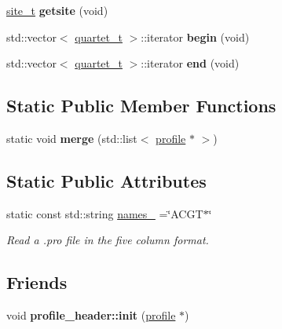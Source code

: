 \begin{DoxyCompactItemize}
\item 
\hypertarget{classprofile_aa7e56e10f37b55e5a2567117869300ef}{\hyperlink{classsite__t}{site\-\_\-t} {\bfseries getsite} (void)}\label{classprofile_aa7e56e10f37b55e5a2567117869300ef}

\item 
\hypertarget{classprofile_a075e3dfdf9550243f974bdf296b84c81}{std\-::vector$<$ \hyperlink{structquartet}{quartet\-\_\-t} $>$\-::iterator {\bfseries begin} (void)}\label{classprofile_a075e3dfdf9550243f974bdf296b84c81}

\item 
\hypertarget{classprofile_a5a833f4d840a4afc764602ee11a5f905}{std\-::vector$<$ \hyperlink{structquartet}{quartet\-\_\-t} $>$\-::iterator {\bfseries end} (void)}\label{classprofile_a5a833f4d840a4afc764602ee11a5f905}

\end{DoxyCompactItemize}
\subsection*{Static Public Member Functions}
\begin{DoxyCompactItemize}
\item 
\hypertarget{classprofile_afcb4eaf9094258e1399ded1386caa73e}{static void {\bfseries merge} (std\-::list$<$ \hyperlink{classprofile}{profile} $\ast$ $>$)}\label{classprofile_afcb4eaf9094258e1399ded1386caa73e}

\end{DoxyCompactItemize}
\subsection*{Static Public Attributes}
\begin{DoxyCompactItemize}
\item 
static const std\-::string \hyperlink{classprofile_a3d781f0fa1b05161fdcc623667fa66ea}{names\-\_\-} =\char`\"{}A\-C\-G\-T$\ast$\char`\"{}
\begin{DoxyCompactList}\small\item\em Read a .pro file in the five column format. \end{DoxyCompactList}\end{DoxyCompactItemize}
\subsection*{Friends}
\begin{DoxyCompactItemize}
\item 
\hypertarget{classprofile_a0cb442b2b4871225903533e34adec148}{void {\bfseries profile\-\_\-header\-::init} (\hyperlink{classprofile}{profile} $\ast$)}\label{classprofile_a0cb442b2b4871225903533e34adec148}

\end{DoxyCompactItemize}


